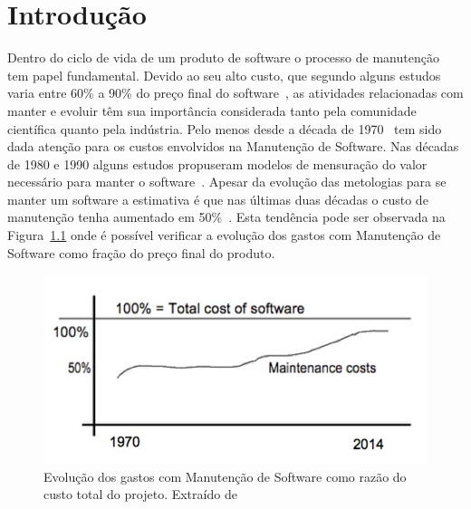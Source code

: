 \chapter{Introdução}
\label{ch:intro}

Dentro do ciclo de vida de um produto de software o processo de manutenção tem
papel fundamental. Devido ao seu alto custo, que segundo alguns estudos varia
entre 60\% a 90\% do preço final do software~\cite{kaur2015review}, as
atividades relacionadas com manter e evoluir têm sua importância considerada
tanto pela comunidade científica quanto pela indústria. Pelo menos desde a
década de 1970~\cite{Zelkowitz:1979:PSE:578504} tem sido dada atenção para os
custos envolvidos na Manutenção de Software. Nas décadas de 1980 e 1990 alguns
estudos propuseram modelos de mensuração do valor necessário para manter o
software~\cite{Herrin:1985:SMC:323287.323383,hirota1994approach}. Apesar da
evolução das metologias para se manter um software a estimativa é que nas
últimas duas décadas o custo de manutenção tenha aumentado em
50\%~\cite{koskinen2010software}. Esta tendência pode ser observada na
Figura~\ref{fig:software-maintence-costs} onde é possível verificar a evolução
dos gastos com Manutenção de Software como fração do preço final do produto.

\begin{figure}[htpb]
\centering
\includegraphics[width=0.6\linewidth]
				{./chapter-intro/img/software-maintence-costs.png}
\caption{Evolução dos gastos com Manutenção de Software como razão do custo
    total do projeto. Extraído de~\cite{engelbertink2010save}}
\label{fig:software-maintence-costs}
\end{figure}

